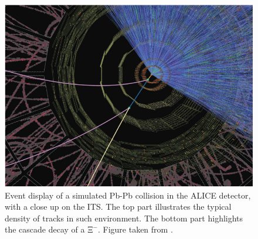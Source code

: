 \documentclass[ALICE,manyauthors]{cernphprep}
\newcommand{\rmXiM}     {\mbox{$\mathrm{\Xi}^{-}$}\xspace}
\begin{document}
\begin{figure}[t]
	\centering
	\includegraphics[width=1\textwidth]{Figs/Chapter4/XiEventDisplay.png}
	\caption{Event display of a simulated Pb-Pb collision in the ALICE detector, with a close up on the ITS. The top part illustrates the typical density of tracks in such environment. The bottom part highlights the cascade decay of a \rmXiM. Figure taken from \cite{alicecollaborationALICEPhysicsPerformance2006}.}
	\label{fig:CascadeDecaySimu}
\end{figure}
\end{document}
